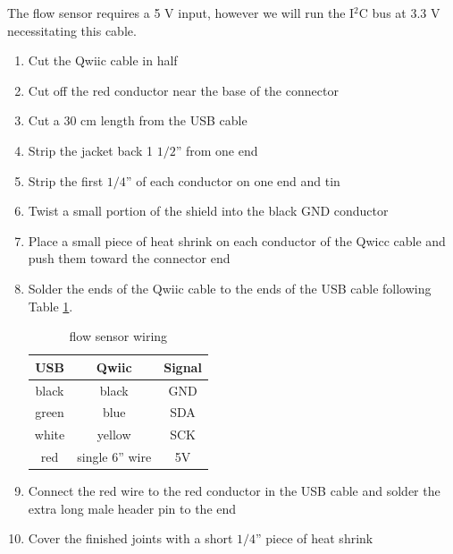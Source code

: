 \documentclass[11pt, letterpaper]{article}
\begin{document}
\begin{enumerate}
\begin{enumerate}[label=4.\arabic*]
The flow sensor requires a 5 V input, however we will run the I$^2$C bus at 3.3 V necessitating this cable.
\\
\begin{enumerate}[label=4.1.\arabic*]
\item
Cut the Qwiic cable in half
\item
Cut off the red conductor near the base of the connector
\item
Cut a 30 cm length from the USB cable
\item
Strip the jacket back 1 $1/2$'' from one end
\item
Strip the first $1/4$'' of each conductor on one end and tin
\item
Twist a small portion of the shield into the black GND conductor
\item
Place a small piece of heat shrink on each conductor of the Qwicc cable and push them toward the connector end
\item
Solder the ends of the Qwiic cable to the ends of the USB cable following Table \ref{tab:flow}.
\begin{table}[H]
\centering
\begin{tabular}{| c | c | c |}
\hline
USB & Qwiic & Signal \\  \hline
black & black & GND \\  \hline
green & blue & SDA \\  \hline
white & yellow & SCK \\  \hline
red & single 6'' wire & 5V \\
\hline
\end{tabular}
\caption{flow sensor wiring}
\label{tab:flow}
\end{table}
\item
Connect the red wire to the red conductor in the USB cable and solder the extra long male header pin to the end
\item
Cover the finished joints with a short $1/4$'' piece of heat shrink
\end{enumerate}


\end{enumerate}
\end{enumerate}
\end{document}

